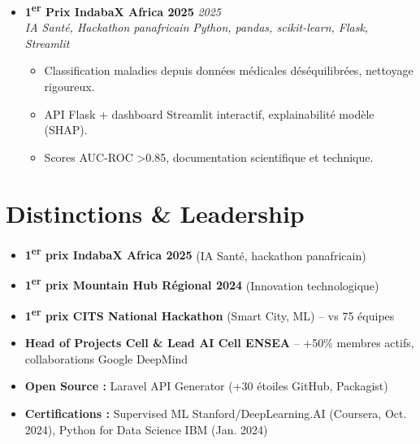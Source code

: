 \documentclass[a4paper,11pt]{article}
\begin{document}
\begin{itemize}[leftmargin=*, label={-}]
    \item \textbf{1\textsuperscript{er} Prix IndabaX Africa 2025} \hfill \textit{2025} \\
    \textit{IA Sant\'e, Hackathon panafricain} \hfill \textit{Python, pandas, scikit-learn, Flask, Streamlit}
    \vspace{-2pt}
    \begin{itemize}[leftmargin=0.4cm, nosep, label=\tiny$\bullet$]
        \item \small{Classification maladies depuis donn\'ees m\'edicales d\'es\'equilibr\'ees, nettoyage rigoureux.}
        \item \small{API Flask + dashboard Streamlit interactif, explainabilit\'e mod\`ele (SHAP).}
        \item \small{Scores AUC-ROC >0.85, documentation scientifique et technique.}
    \end{itemize}
\end{itemize}

\section{Distinctions \& Leadership}
\begin{itemize}[leftmargin=*, label=\tiny$\bullet$, nosep]
    \item \small{\textbf{1\textsuperscript{er} prix IndabaX Africa 2025} (IA Sant\'e, hackathon panafricain)}
    \item \small{\textbf{1\textsuperscript{er} prix Mountain Hub R\'egional 2024} (Innovation technologique)}
    \item \small{\textbf{1\textsuperscript{er} prix CITS National Hackathon} (Smart City, ML) -- vs 75 \'equipes}
    \item \small{\textbf{Head of Projects Cell \& Lead AI Cell ENSEA} -- +50\% membres actifs, collaborations Google DeepMind}
    \item \small{\textbf{Open Source :} Laravel API Generator (+30 \'etoiles GitHub, Packagist)}
    \item \small{\textbf{Certifications :} Supervised ML Stanford/DeepLearning.AI (Coursera, Oct. 2024), Python for Data Science IBM (Jan. 2024)}
\end{itemize}
\end{document}
